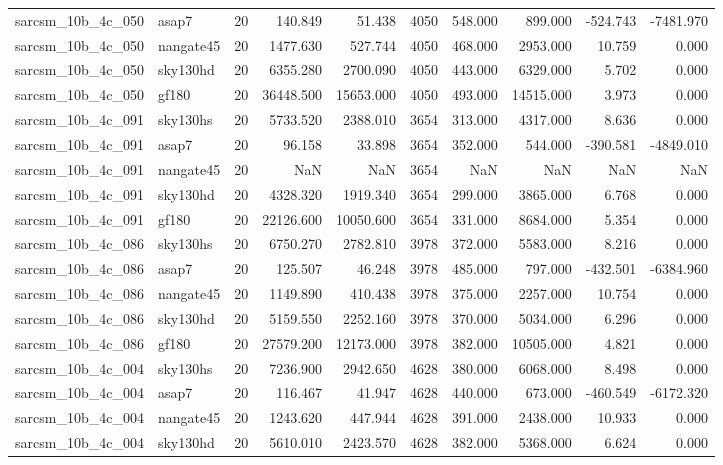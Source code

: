 \begin{tabular}{llrrrrrrrr}
sarcsm\_10b\_4c\_050 & asap7 & 20 & 140.849 & 51.438 & 4050 & 548.000 & 899.000 & -524.743 & -7481.970 \\
sarcsm\_10b\_4c\_050 & nangate45 & 20 & 1477.630 & 527.744 & 4050 & 468.000 & 2953.000 & 10.759 & 0.000 \\
sarcsm\_10b\_4c\_050 & sky130hd & 20 & 6355.280 & 2700.090 & 4050 & 443.000 & 6329.000 & 5.702 & 0.000 \\
sarcsm\_10b\_4c\_050 & gf180 & 20 & 36448.500 & 15653.000 & 4050 & 493.000 & 14515.000 & 3.973 & 0.000 \\
sarcsm\_10b\_4c\_091 & sky130hs & 20 & 5733.520 & 2388.010 & 3654 & 313.000 & 4317.000 & 8.636 & 0.000 \\
sarcsm\_10b\_4c\_091 & asap7 & 20 & 96.158 & 33.898 & 3654 & 352.000 & 544.000 & -390.581 & -4849.010 \\
sarcsm\_10b\_4c\_091 & nangate45 & 20 & NaN & NaN & 3654 & NaN & NaN & NaN & NaN \\
sarcsm\_10b\_4c\_091 & sky130hd & 20 & 4328.320 & 1919.340 & 3654 & 299.000 & 3865.000 & 6.768 & 0.000 \\
sarcsm\_10b\_4c\_091 & gf180 & 20 & 22126.600 & 10050.600 & 3654 & 331.000 & 8684.000 & 5.354 & 0.000 \\
sarcsm\_10b\_4c\_086 & sky130hs & 20 & 6750.270 & 2782.810 & 3978 & 372.000 & 5583.000 & 8.216 & 0.000 \\
sarcsm\_10b\_4c\_086 & asap7 & 20 & 125.507 & 46.248 & 3978 & 485.000 & 797.000 & -432.501 & -6384.960 \\
sarcsm\_10b\_4c\_086 & nangate45 & 20 & 1149.890 & 410.438 & 3978 & 375.000 & 2257.000 & 10.754 & 0.000 \\
sarcsm\_10b\_4c\_086 & sky130hd & 20 & 5159.550 & 2252.160 & 3978 & 370.000 & 5034.000 & 6.296 & 0.000 \\
sarcsm\_10b\_4c\_086 & gf180 & 20 & 27579.200 & 12173.000 & 3978 & 382.000 & 10505.000 & 4.821 & 0.000 \\
sarcsm\_10b\_4c\_004 & sky130hs & 20 & 7236.900 & 2942.650 & 4628 & 380.000 & 6068.000 & 8.498 & 0.000 \\
sarcsm\_10b\_4c\_004 & asap7 & 20 & 116.467 & 41.947 & 4628 & 440.000 & 673.000 & -460.549 & -6172.320 \\
sarcsm\_10b\_4c\_004 & nangate45 & 20 & 1243.620 & 447.944 & 4628 & 391.000 & 2438.000 & 10.933 & 0.000 \\
sarcsm\_10b\_4c\_004 & sky130hd & 20 & 5610.010 & 2423.570 & 4628 & 382.000 & 5368.000 & 6.624 & 0.000 \\

\end{tabular}
